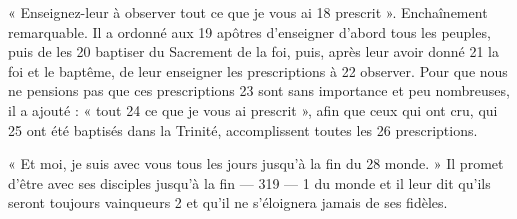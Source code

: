 « Enseignez-leur à observer tout ce que je vous ai	 
18	 	prescrit ». Enchaînement remarquable. Il a ordonné aux	 
19	 	apôtres d'enseigner d'abord tous les peuples, puis de les	 
20	 	baptiser du Sacrement de la foi, puis, après leur avoir donné	 
21	 	la foi et le baptême, de leur enseigner les prescriptions à	 
22	 	observer. Pour que nous ne pensions pas que ces prescriptions	 
23	 	sont sans importance et peu nombreuses, il a ajouté : « tout	 
24	 	ce que je vous ai prescrit », afin que ceux qui ont cru, qui	 
25	 	ont été baptisés dans la Trinité, accomplissent toutes les	 
26	 	prescriptions.

« Et moi, je suis avec vous tous les jours jusqu'à la fin du	 
28	 	monde. » Il promet d'être avec ses disciples jusqu'à la fin	 
 	--- 319 ---	 
1	 	du monde et il leur dit qu'ils seront toujours vainqueurs	 
2	 	et qu'il ne s'éloignera jamais de ses fidèles.